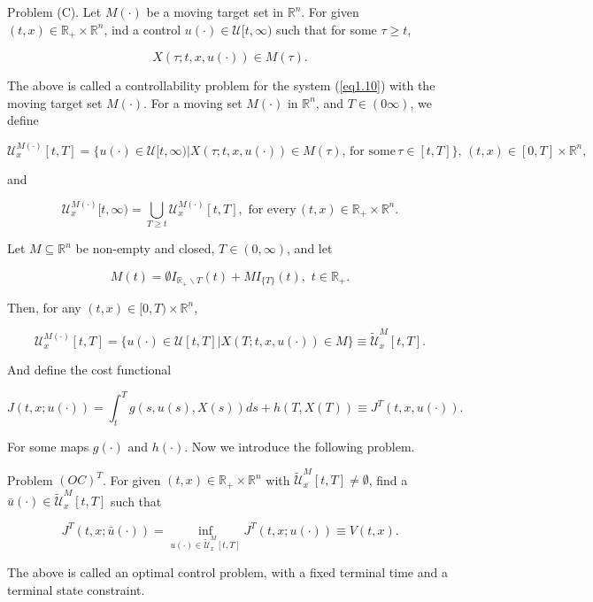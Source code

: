 Problem (C). Let $M(\cdot)$ be a moving target set in $\mathbb{R}^n$. For given $(t,x)\in \mathbb{R}_{+}\times \mathbb{R}^n$, ind a control $u(\cdot)\in \mathcal{U}[t,\infty)$ such that for some $\tau \geq t$,

$$X(\tau;t,x,u(\cdot))\in M(\tau).$$

The above is called a controllability problem for the system (\ref{eq1.10}) with the moving target set $M(\cdot)$. For a moving set $M(\cdot)$ in $\mathbb{R}^n$, and $T\in (0\infty)$, we define

$$\mathcal{U}^{M(\cdot)}_x[t,T]=\{u(\cdot)\in \mathcal{U}[t,\infty) | X(\tau;t,x,u(\cdot))\in M(\tau),\,\mbox{for some}\, \tau\in[t,T]\},\, (t,x)\in [0,T]\times \mathbb{R}^n,$$

and

$$\mathcal{U}^{M(\cdot)}_x[t,\infty)=\bigcup_{T\geq t}\mathcal{U}^{M(\cdot)}_x[t,T],\,\,\mbox{for every}\, (t,x)\in\mathbb{R}_{+}\times\mathbb{R}^n.$$

Let $M\subseteq \mathbb{R}^n$ be non-empty and closed, $T\in(0,\infty)$, and let

$$M(t)=\emptyset I_{\mathbb{R}_{+}\backslash{T}}(t)+MI_{\{T\}}(t),\,\, t\in \mathbb{R}_{+}.$$

Then, for any $(t,x)\in [0,T)\times \mathbb{R}^n$,

$$\mathcal{U}^{M(\cdot)}_x[t,T]=\{u(\cdot)\in \mathcal{U}[t,T] | X(T;t,x,u(\cdot))\in M \}\equiv \tilde{\mathcal{U}}^M_x [t,T].$$

And define the cost functional

$$J(t,x;u(\cdot))=\int_{t}^{T}g(s,u(s),X(s))ds+h(T,X(T))\equiv J^T(t,x,u(\cdot)).$$

For some maps $g(\cdot)$ and $h(\cdot)$. Now we introduce the following problem.

Problem $(OC)^T$. For given $(t,x)\in \mathbb{R}_{+}\times \mathbb{R}^n$ with $\tilde{\mathcal{U}}^M_x[t,T]\neq\emptyset$, find a $\bar{u}(\cdot)\in \tilde{\mathcal{U}}^M_x[t,T]$ such that

\begin{equation*}
J^T(t,x;\bar{u}(\cdot))=\inf_{u(\cdot)\in \tilde{\mathcal{U}}^M_x[t,T]} J^T(t,x;u(\cdot))\equiv V(t,x).
\end{equation*}

The above is called an optimal control problem, with a fixed terminal time and a terminal state constraint.
